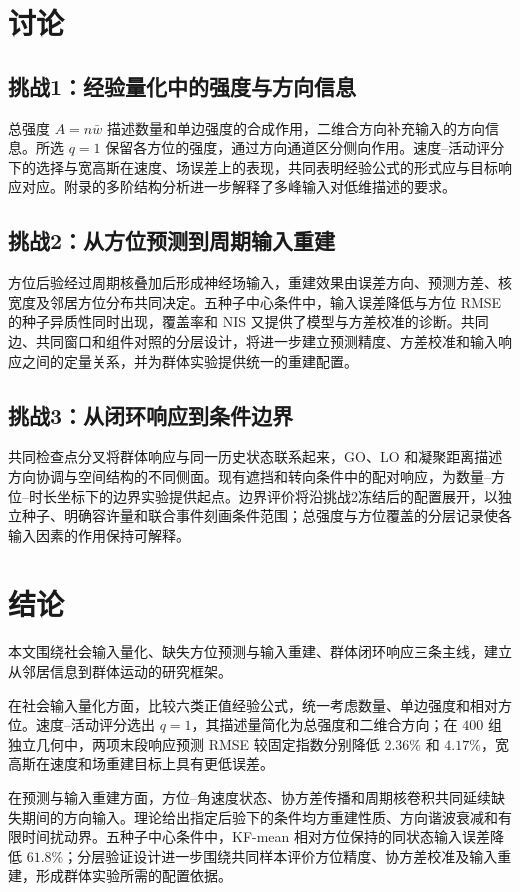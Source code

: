 \documentclass[UTF8,fontset=windows,11pt]{ctexart}
\begin{document}
\section{讨论}

\subsection{挑战1：经验量化中的强度与方向信息}
总强度 $A=n\bar w$ 描述数量和单边强度的合成作用，二维合方向补充输入的方向信息。所选 $q=1$ 保留各方位的强度，通过方向通道区分侧向作用。速度--活动评分下的选择与宽高斯在速度、场误差上的表现，共同表明经验公式的形式应与目标响应对应。附录的多阶结构分析进一步解释了多峰输入对低维描述的要求。

\subsection{挑战2：从方位预测到周期输入重建}
方位后验经过周期核叠加后形成神经场输入，重建效果由误差方向、预测方差、核宽度及邻居方位分布共同决定。五种子中心条件中，输入误差降低与方位 RMSE 的种子异质性同时出现，覆盖率和 NIS 又提供了模型与方差校准的诊断。共同边、共同窗口和组件对照的分层设计，将进一步建立预测精度、方差校准和输入响应之间的定量关系，并为群体实验提供统一的重建配置。

\subsection{挑战3：从闭环响应到条件边界}
共同检查点分叉将群体响应与同一历史状态联系起来，GO、LO 和凝聚距离描述方向协调与空间结构的不同侧面。现有遮挡和转向条件中的配对响应，为数量--方位--时长坐标下的边界实验提供起点。边界评价将沿挑战2冻结后的配置展开，以独立种子、明确容许量和联合事件刻画条件范围；总强度与方位覆盖的分层记录使各输入因素的作用保持可解释。

\section{结论}

本文围绕社会输入量化、缺失方位预测与输入重建、群体闭环响应三条主线，建立从邻居信息到群体运动的研究框架。

在社会输入量化方面，比较六类正值经验公式，统一考虑数量、单边强度和相对方位。速度--活动评分选出 $q=1$，其描述量简化为总强度和二维合方向；在 $400$ 组独立几何中，两项末段响应预测 RMSE 较固定指数分别降低 $2.36\%$ 和 $4.17\%$，宽高斯在速度和场重建目标上具有更低误差。

在预测与输入重建方面，方位--角速度状态、协方差传播和周期核卷积共同延续缺失期间的方向输入。理论给出指定后验下的条件均方重建性质、方向谐波衰减和有限时间扰动界。五种子中心条件中，KF-mean 相对方位保持的同状态输入误差降低 $61.8\%$；分层验证设计进一步围绕共同样本评价方位精度、协方差校准及输入重建，形成群体实验所需的配置依据。
\end{document}
